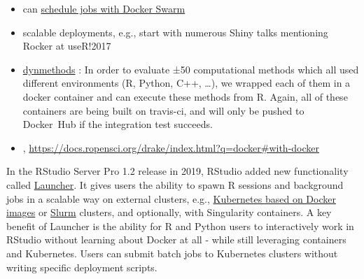 \begin{itemize}
\tightlist
\item
   \citep{Lang2017batchtools} can
  \href{https://mllg.github.io/batchtools/reference/makeClusterFunctionsDocker.html}{schedule
  jobs with Docker Swarm}
\item
  scalable deployments, e.g., start with numerous Shiny talks mentioning
  Rocker at useR!2017
\item
  \href{https://github.com/dynverse/dynmethods}{dynmethods}
  \citep{rcannood}: In order to evaluate ±50 computational methods which
  all used different environments (R, Python, C++, \ldots{}), we wrapped
  each of them in a docker container and can execute these methods from
  R. Again, all of these containers are being built on travis-ci, and
  will only be pushed to Docker~Hub if the integration test succeeds.
\item
  ,
  \url{https://docs.ropensci.org/drake/index.html?q=docker\#with-docker}
\end{itemize}

In the RStudio Server Pro 1.2 release in 2019, RStudio added new
functionality called
\href{https://solutions.rstudio.com/launcher/overview/}{Launcher}. It
gives users the ability to spawn R sessions and background jobs in a
scalable way on external clusters, e.g.,
\href{https://support.rstudio.com/hc/en-us/articles/360019253393-Using-Docker-images-with-RStudio-Server-Pro-Launcher-and-Kubernetes}{Kubernetes
based on Docker images} or \href{https://slurm.schedmd.com/}{Slurm}
clusters, and optionally, with Singularity containers. A key benefit of
Launcher is the ability for R and Python users to interactively work in
RStudio without learning about Docker at all - while still leveraging
containers and Kubernetes. Users can submit batch jobs to Kubernetes
clusters without writing specific deployment scripts.

